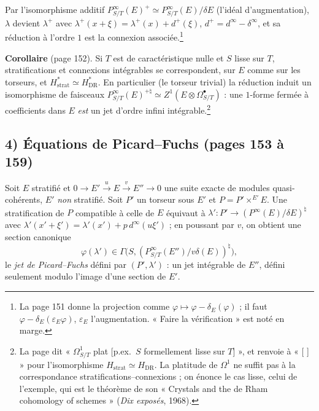 \documentclass[11pt,a4paper]{article}
\begin{document}
Par l'isomorphisme additif $P^\infty_{S/T}(E)^+ \simeq P^\infty_{S/T}(E)/\delta E$
(l'idéal d'augmentation), $\lambda$ devient $\lambda^+$ avec $\lambda^+(x +
\xi) = \lambda^+(x) + d^+(\xi)$, $d^+ = d^\infty - \delta^\infty$, et sa réduction
à l'ordre $1$ est la connexion associée.\footnote{La page 151 donne la
projection comme $\varphi \mapsto \varphi - \delta_E(\varphi)$ ; il faut
$\varphi - \delta_E(\varepsilon_E \varphi)$, $\varepsilon_E$ l'augmentation.
« Faire la vérification » est noté en marge.}

\textbf{Corollaire} (page 152). Si $T$ est de caractéristique nulle et $S$
lisse sur $T$, stratifications et connexions intégrables se correspondent, sur
$E$ comme sur les torseurs, et $H^*_{\mathrm{strat}} \simeq H^*_{\mathrm{DR}}$. En
particulier (le torseur trivial) la réduction induit un isomorphisme de
faisceaux $P^\infty_{S/T}(E)^{+\natural} \simeq Z^1(E \otimes
\Omega^\bullet_{S/T})$ : une $1$-forme fermée à coefficients dans $E$
\emph{est} un jet d'ordre infini intégrable.\footnote{La page dit
« $\Omega^1_{S/T}$ plat [p.ex.\ $S$ formellement lisse sur $T$] », et renvoie
à « [ ] » pour l'isomorphisme $H_{\mathrm{strat}} \simeq H_{\mathrm{DR}}$. La
platitude de $\Omega^1$ ne suffit pas à la correspondance
stratifications--connexions ; on énonce le cas lisse, celui de l'exemple, qui
est le théorème de son « Crystals and the de Rham cohomology of schemes »
(\emph{Dix exposés}, 1968).}

\subsection*{4) Équations de Picard--Fuchs (pages 153 à 159)}

Soit $E$ stratifié et $0 \to E' \xrightarrow{u} E \xrightarrow{v} E'' \to 0$
une suite exacte de modules quasi-cohérents, $E'$ \emph{non} stratifié. Soit
$P'$ un torseur sous $E'$ et $P = P' \times^{E'} E$. Une stratification de $P$
compatible à celle de $E$ équivaut à $\lambda' : P' \to (P^\infty(E)/\delta
E)^\natural$ avec $\lambda'(x' + \xi') = \lambda'(x') + p\,d^\infty(u\xi')$ ; en
poussant par $v$, on obtient une section canonique
\[
  \varphi(\lambda') \in \Gamma\bigl(S, (P^\infty_{S/T}(E'')/v\delta(E))^\natural\bigr),
\]
le \emph{jet de Picard--Fuchs} défini par $(P', \lambda')$ : un jet intégrable
de $E''$, défini seulement modulo l'image d'une section de $E'$.
\end{document}
